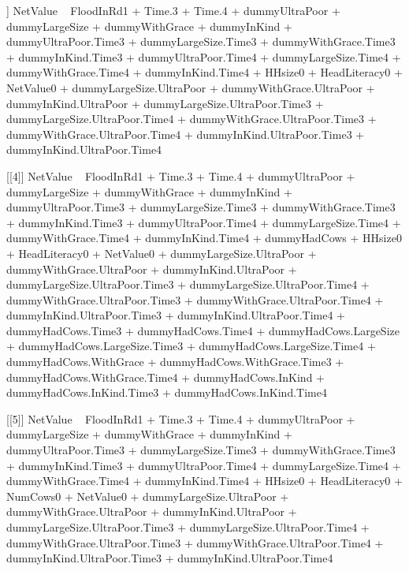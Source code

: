 \begin{Schunk}
\begin{Soutput}
[[3]]
NetValue ~ FloodInRd1 + Time.3 + Time.4 + dummyUltraPoor + dummyLargeSize + 
    dummyWithGrace + dummyInKind + dummyUltraPoor.Time3 + dummyLargeSize.Time3 + 
    dummyWithGrace.Time3 + dummyInKind.Time3 + dummyUltraPoor.Time4 + 
    dummyLargeSize.Time4 + dummyWithGrace.Time4 + dummyInKind.Time4 + 
    HHsize0 + HeadLiteracy0 + NetValue0 + dummyLargeSize.UltraPoor + 
    dummyWithGrace.UltraPoor + dummyInKind.UltraPoor + dummyLargeSize.UltraPoor.Time3 + 
    dummyLargeSize.UltraPoor.Time4 + dummyWithGrace.UltraPoor.Time3 + 
    dummyWithGrace.UltraPoor.Time4 + dummyInKind.UltraPoor.Time3 + 
    dummyInKind.UltraPoor.Time4

[[4]]
NetValue ~ FloodInRd1 + Time.3 + Time.4 + dummyUltraPoor + dummyLargeSize + 
    dummyWithGrace + dummyInKind + dummyUltraPoor.Time3 + dummyLargeSize.Time3 + 
    dummyWithGrace.Time3 + dummyInKind.Time3 + dummyUltraPoor.Time4 + 
    dummyLargeSize.Time4 + dummyWithGrace.Time4 + dummyInKind.Time4 + 
    dummyHadCows + HHsize0 + HeadLiteracy0 + NetValue0 + dummyLargeSize.UltraPoor + 
    dummyWithGrace.UltraPoor + dummyInKind.UltraPoor + dummyLargeSize.UltraPoor.Time3 + 
    dummyLargeSize.UltraPoor.Time4 + dummyWithGrace.UltraPoor.Time3 + 
    dummyWithGrace.UltraPoor.Time4 + dummyInKind.UltraPoor.Time3 + 
    dummyInKind.UltraPoor.Time4 + dummyHadCows.Time3 + dummyHadCows.Time4 + 
    dummyHadCows.LargeSize + dummyHadCows.LargeSize.Time3 + dummyHadCows.LargeSize.Time4 + 
    dummyHadCows.WithGrace + dummyHadCows.WithGrace.Time3 + dummyHadCows.WithGrace.Time4 + 
    dummyHadCows.InKind + dummyHadCows.InKind.Time3 + dummyHadCows.InKind.Time4

[[5]]
NetValue ~ FloodInRd1 + Time.3 + Time.4 + dummyUltraPoor + dummyLargeSize + 
    dummyWithGrace + dummyInKind + dummyUltraPoor.Time3 + dummyLargeSize.Time3 + 
    dummyWithGrace.Time3 + dummyInKind.Time3 + dummyUltraPoor.Time4 + 
    dummyLargeSize.Time4 + dummyWithGrace.Time4 + dummyInKind.Time4 + 
    HHsize0 + HeadLiteracy0 + NumCows0 + NetValue0 + dummyLargeSize.UltraPoor + 
    dummyWithGrace.UltraPoor + dummyInKind.UltraPoor + dummyLargeSize.UltraPoor.Time3 + 
    dummyLargeSize.UltraPoor.Time4 + dummyWithGrace.UltraPoor.Time3 + 
    dummyWithGrace.UltraPoor.Time4 + dummyInKind.UltraPoor.Time3 + 
    dummyInKind.UltraPoor.Time4


\end{Soutput}
\end{Schunk}
